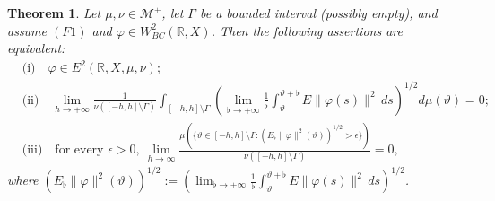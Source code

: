 \documentclass[10pt,a4paper]{amsart}
\newtheorem{theorem}{Theorem}[section]
\begin{document}
\begin{theorem}\label{E2char}
Let $\mu,\nu\in\mathcal M^+$, let $\Gamma$ be a bounded interval (possibly empty), and assume $(F1)$ and $\varphi\in W^2_{BC}(\mathbb R,X)$. Then the following assertions are equivalent:
\begin{align*}
&\text{(i)}\quad \varphi\in E^2(\mathbb R,X,\mu,\nu);\\
&\text{(ii)}\quad \lim_{h\to+\infty}\frac1{\nu([-h,h]\setminus\Gamma)}\int_{[-h,h]\setminus\Gamma}\left(\lim_{\flat\to+\infty}\frac1\flat\int_\vartheta^{\vartheta+\flat}E\|\varphi(s)\|^2\,ds\right)^{1/2}d\mu(\vartheta)=0;\\
&\text{(iii)}\quad \text{for every }\epsilon>0,\ \lim_{h\to\infty}\frac{\mu(\{\vartheta\in[-h,h]\setminus\Gamma:(E_\flat\|\varphi\|^2(\vartheta))^{1/2}>\epsilon\})}{\nu([-h,h]\setminus\Gamma)}=0,
\end{align*}
where $(E_\flat\|\varphi\|^2(\vartheta))^{1/2}:=\left(\lim_{\flat\to+\infty}\frac1\flat\int_\vartheta^{\vartheta+\flat}E\|\varphi(s)\|^2\,ds\right)^{1/2}$.
\end{theorem}
\end{document}
